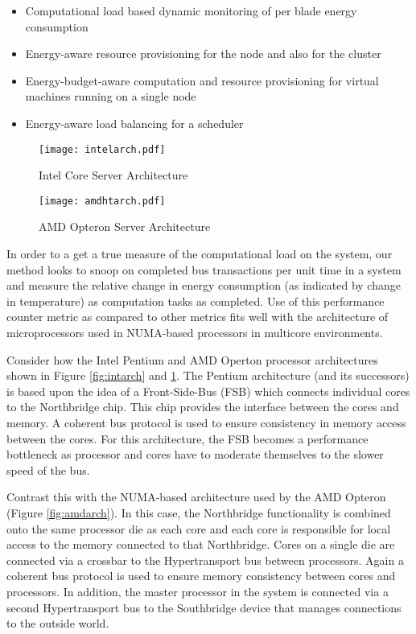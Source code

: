 \documentclass[times, 10pt,onecolumn]{article}
\begin{document}
\begin{itemize}
\item Computational load based dynamic monitoring of per blade energy
consumption
\item Energy-aware resource provisioning for the node and also for the
cluster
\item Energy-budget-aware computation and resource provisioning for
virtual machines running on a single node
\item Energy-aware load balancing for a scheduler
\end{itemize}
 \begin{figure}[ht]
   \begin{minipage}[b]{0.5\linewidth}
     \centering
     \texttt{[image: intelarch.pdf]}
     \caption{Intel Core Server Architecture}
     \label{fig:intarch}
   \end{minipage}
   \hspace{0.5cm}
   \begin{minipage}[b]{0.5\linewidth}
     \centering
     \texttt{[image: amdhtarch.pdf]}
     \caption{AMD Opteron Server Architecture}
     \label{fig:optarch}
   \end{minipage}
 \end{figure}

In order to a get a true measure of the computational load on the
system, our method looks to snoop on completed bus transactions per unit
time in a system and measure the relative change in energy consumption
(as indicated by change in temperature) as computation tasks as
completed.   Use of this performance counter metric as compared to other
metrics fits well with the architecture of microprocessors used in
NUMA-based processors in multicore environments.   

Consider how the Intel Pentium and AMD Operton
processor architectures shown in Figure \ref{fig:intarch} and
\ref{fig:optarch}.  The Pentium architecture (and its successors) is based
upon the idea of a Front-Side-Bus (FSB) which connects individual cores to the
Northbridge chip.  This chip provides the interface between the cores and
memory.  A coherent bus protocol is used to ensure consistency in memory
access between the cores.  For this architecture, the FSB becomes a
performance bottleneck as processor and cores have to moderate themselves to
the slower speed of the bus.  

Contrast this with the NUMA-based architecture used by the AMD Opteron (Figure
\ref{fig:amdarch}).  In this case, the Northbridge functionality is combined
onto the same processor die as each core and each core is responsible for
local access to the memory connected to that Northbridge.    Cores on a single
die are connected via a crossbar to the Hypertransport bus between
processors.  Again a coherent bus protocol is used to ensure memory
consistency between cores and processors.   In addition, the master processor
in the system is connected via a second Hypertransport bus to the Southbridge
device that manages connections to the outside world.
\end{document}
